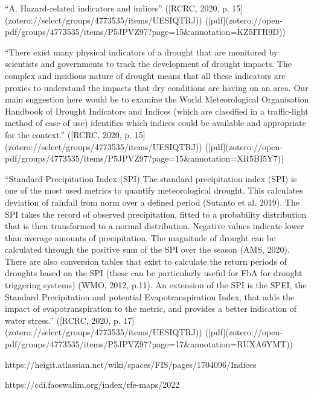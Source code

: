{“A. Hazard-related indicators and indices” ([RCRC, 2020, p. 15](zotero://select/groups/4773535/items/UESIQTRJ)) ([pdf](zotero://open-pdf/groups/4773535/items/P5JPVZ97?page=15&annotation=KZ5ITR9D))

“There exist many physical indicators of a drought that are monitored by scientists and governments to track the development of drought impacts. The complex and insidious nature of drought means that all these indicators are proxies to understand the impacts that dry conditions are having on an area. Our main suggestion here would be to examine the World Meteorological Organisation Handbook of Drought Indicators and Indices (which are classified in a traffic-light method of ease of use) identifies which indices could be available and appropriate for the context.” ([RCRC, 2020, p. 15](zotero://select/groups/4773535/items/UESIQTRJ)) ([pdf](zotero://open-pdf/groups/4773535/items/P5JPVZ97?page=15&annotation=XR5BI5Y7))


“Standard Precipitation Index (SPI) The standard precipitation index (SPI) is one of the most used metrics to quantify meteorological drought. This calculates deviation of rainfall from norm over a defined period (Sutanto et al. 2019). The SPI takes the record of observed precipitation, fitted to a probability distribution that is then transformed to a normal distribution. Negative values indicate lower than average amounts of precipitation. The magnitude of drought can be calculated through the positive sum of the SPI over the season (AMS, 2020). There are also conversion tables that exist to calculate the return periods of droughts based on the SPI (these can be particularly useful for FbA for drought triggering systems) (WMO, 2012, p.11). An extension of the SPI is the SPEI, the Standard Precipitation and potential Evapotranspiration Index, that adds the impact of evapotranspiration to the metric, and provides a better indication of water stress.” ([RCRC, 2020, p. 17](zotero://select/groups/4773535/items/UESIQTRJ)) ([pdf](zotero://open-pdf/groups/4773535/items/P5JPVZ97?page=17&annotation=RUXA6YMT))

https://heigit.atlassian.net/wiki/spaces/FIS/pages/1704096/Indices



https://cdi.faoswalim.org/index/rfe-maps/2022

}
